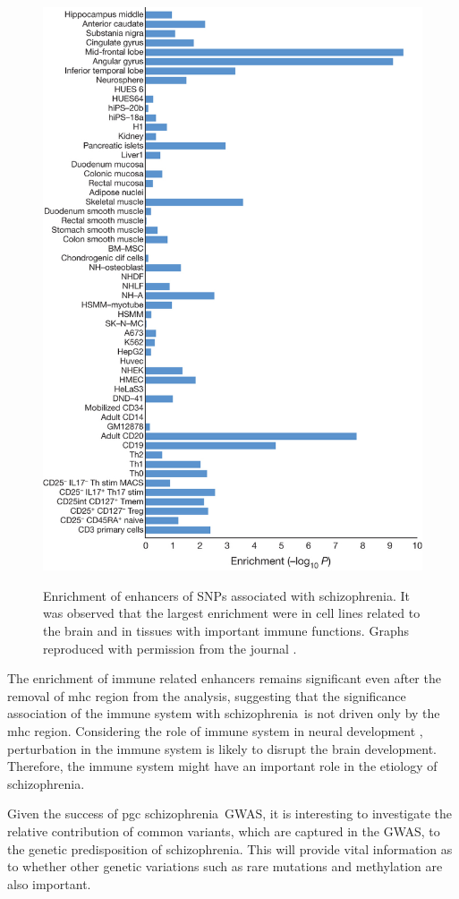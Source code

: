 \documentclass[12pt]{scrbook}
\newcommand*{\scz}{schizophrenia}
\begin{document}
\begin{figure}
	\centering
	\caption[Enrichment of enhancers of SNPs associated with Schizophrenia]{Enrichment of enhancers of SNPs associated with \scz. 
		It was observed that the largest enrichment were in cell lines related to the brain and in tissues with important immune functions. 
		Graphs reproduced with permission from the journal \citep{Ripke2014}.}
	\includegraphics[height=\textwidth]{figure/pgc_enrichment_tissue.jpg}
	\label{fig:pgcEnrich}
\end{figure}

The enrichment of immune related enhancers remains significant even after the removal of \gls{mhc} region from the analysis, suggesting that the significance association of the immune system with \scz\ is not driven only by the \gls{mhc} region.
Considering the role of immune system in neural development \citep{Zhao1998,Deverman2009}, perturbation in the immune system is likely to disrupt the brain development.
Therefore, the immune system might have an important role in the etiology of \scz.

Given the success of \gls{pgc} \scz\ \gls{GWAS}, it is interesting to investigate the relative contribution of common variants, which are captured in the \gls{GWAS}, to the genetic predisposition of \scz.
This will provide vital information as to whether other genetic variations such as rare mutations and methylation are also important. 
\end{document}
